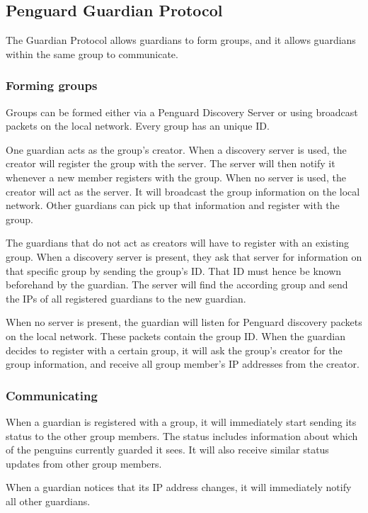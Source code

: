 \documentclass{report}
\begin{document}
\subsection{Penguard Guardian Protocol}

The Guardian Protocol allows guardians to form groups, and it allows guardians within the same group to communicate.

\subsubsection{Forming groups}

Groups can be formed either via a Penguard Discovery Server or using broadcast packets on the local network. Every group has an unique ID.

One guardian acts as the group's creator. When a discovery server is used, the creator will register the group with the server. The server will then notify it whenever a new member registers with the group. When no server is used, the creator will act as the server. It will broadcast the group information on the local network. Other guardians can pick up that information and register with the group.

The guardians that do not act as creators will have to register with an existing group. When a discovery server is present, they ask that server for information on that specific group by sending the group's ID. That ID must hence be known beforehand by the guardian. The server will find the according group and send the IPs of all registered guardians to the new guardian.

When no server is present, the guardian will listen for Penguard discovery packets on the local network. These packets contain the group ID. When the guardian decides to register with a certain group, it will ask the group's creator for the group information, and receive all group member's IP addresses from the creator.

\subsubsection{Communicating}

When a guardian is registered with a group, it will immediately start sending its status to the other group members. The status includes information about which of the penguins currently guarded it sees. It will also receive similar status updates from other group members.

When a guardian notices that its IP address changes, it will immediately notify all other guardians.
\end{document}

